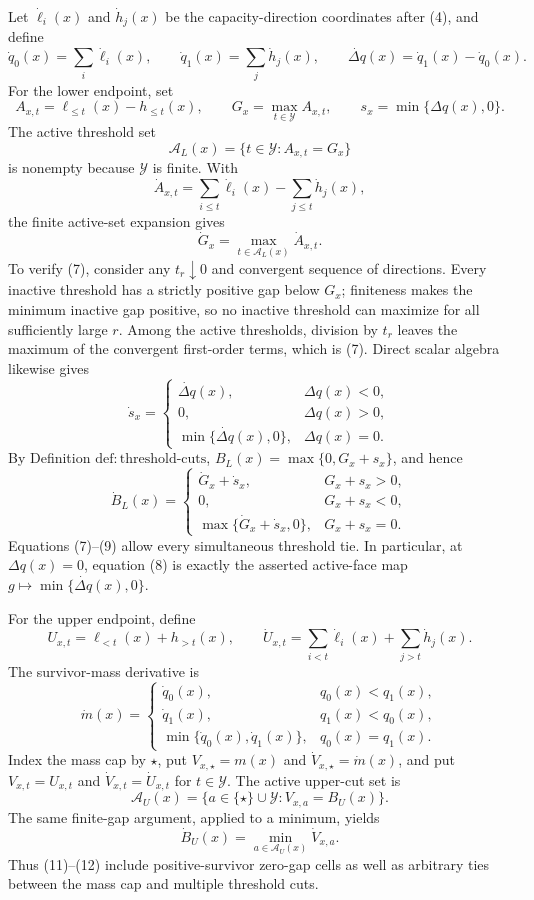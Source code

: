 Let \(\dot\ell_i(x)\) and \(\dot h_j(x)\) be the capacity-direction coordinates after (4), and define
\[
\dot q_0(x)=\sum_i\dot\ell_i(x),
\qquad
\dot q_1(x)=\sum_j\dot h_j(x),
\qquad
\dot{\Delta q}(x)=\dot q_1(x)-\dot q_0(x).
\tag{5}
\]
For the lower endpoint, set
\[
A_{x,t}=\ell_{\le t}(x)-h_{\le t}(x),
\qquad
G_x=\max_{t\in\mathcal Y}A_{x,t},
\qquad
s_x=\min\{\Delta q(x),0\}.
\tag{6}
\]
The active threshold set
\[
\mathcal A_L(x)=\{t\in\mathcal Y:A_{x,t}=G_x\}
\]
is nonempty because \(\mathcal Y\) is finite.  With
\[
\dot A_{x,t}=\sum_{i\le t}\dot\ell_i(x)-\sum_{j\le t}\dot h_j(x),
\]
the finite active-set expansion gives
\[
\dot G_x=\max_{t\in\mathcal A_L(x)}\dot A_{x,t}.
\tag{7}
\]
To verify (7), consider any \(t_r\downarrow0\) and convergent sequence of directions.  Every inactive threshold has a strictly positive gap below \(G_x\); finiteness makes the minimum inactive gap positive, so no inactive threshold can maximize for all sufficiently large \(r\).  Among the active thresholds, division by \(t_r\) leaves the maximum of the convergent first-order terms, which is (7).  Direct scalar algebra likewise gives
\[
\dot s_x=
\begin{cases}
\dot{\Delta q}(x),&\Delta q(x)<0,\\
0,&\Delta q(x)>0,\\
\min\{\dot{\Delta q}(x),0\},&\Delta q(x)=0.
\end{cases}
\tag{8}
\]
By Definition \(\mathrm{def{:}threshold\text{-}cuts}\), \(B_L(x)=\max\{0,G_x+s_x\}\), and hence
\[
\dot B_L(x)=
\begin{cases}
\dot G_x+\dot s_x,&G_x+s_x>0,\\
0,&G_x+s_x<0,\\
\max\{\dot G_x+\dot s_x,0\},&G_x+s_x=0.
\end{cases}
\tag{9}
\]
Equations (7)--(9) allow every simultaneous threshold tie.  In particular, at \(\Delta q(x)=0\), equation (8) is exactly the asserted active-face map \(g\mapsto\min\{\dot{\Delta q}(x),0\}\).

For the upper endpoint, define
\[
U_{x,t}=\ell_{<t}(x)+h_{>t}(x),
\qquad
\dot U_{x,t}=\sum_{i<t}\dot\ell_i(x)+\sum_{j>t}\dot h_j(x).
\tag{10}
\]
The survivor-mass derivative is
\[
\dot m(x)=
\begin{cases}
\dot q_0(x),&q_0(x)<q_1(x),\\
\dot q_1(x),&q_1(x)<q_0(x),\\
\min\{\dot q_0(x),\dot q_1(x)\},&q_0(x)=q_1(x).
\end{cases}
\tag{11}
\]
Index the mass cap by \(\star\), put \(V_{x,\star}=m(x)\) and \(\dot V_{x,\star}=\dot m(x)\), and put \(V_{x,t}=U_{x,t}\) and \(\dot V_{x,t}=\dot U_{x,t}\) for \(t\in\mathcal Y\).  The active upper-cut set is
\[
\mathcal A_U(x)=\{a\in\{\star\}\cup\mathcal Y:V_{x,a}=B_U(x)\}.
\]
The same finite-gap argument, applied to a minimum, yields
\[
\dot B_U(x)=\min_{a\in\mathcal A_U(x)}\dot V_{x,a}.
\tag{12}
\]
Thus (11)--(12) include positive-survivor zero-gap cells as well as arbitrary ties between the mass cap and multiple threshold cuts.

